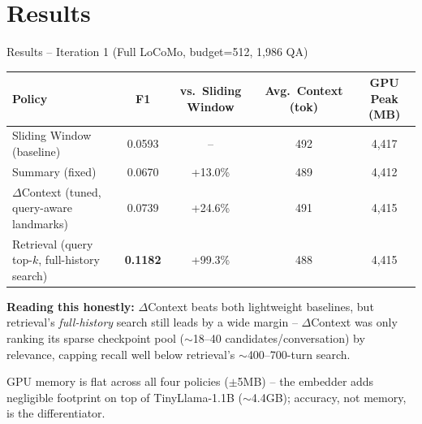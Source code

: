 \documentclass[aspectratio=169]{beamer}
\begin{document}
\section{Results}

\begin{frame}{Results -- Iteration 1 (Full LoCoMo, budget=512, 1{,}986 QA)}
    \begin{table}
    \centering
    \small
    \begin{tabular}{lcccc}
    \toprule
    Policy & F1 & vs.\ Sliding Window & Avg.\ Context (tok) & GPU Peak (MB) \\
    \midrule
    Sliding Window (baseline) & 0.0593 & -- & 492 & 4{,}417 \\
    Summary (fixed) & 0.0670 & +13.0\% & 489 & 4{,}412 \\
    $\Delta$Context (tuned, query-aware landmarks) & 0.0739 & +24.6\% & 491 & 4{,}415 \\
    Retrieval (query top-$k$, full-history search) & \textbf{0.1182} & +99.3\% & 488 & 4{,}415 \\
    \bottomrule
    \end{tabular}
    \end{table}

    \vspace{0.3cm}
    \textbf{Reading this honestly:} $\Delta$Context beats both lightweight baselines, but retrieval's \emph{full-history} search still leads by a wide margin -- $\Delta$Context was only ranking its sparse checkpoint pool ($\sim$18--40 candidates/conversation) by relevance, capping recall well below retrieval's $\sim$400--700-turn search.

    \vspace{0.15cm}
    \small GPU memory is flat across all four policies ($\pm$5MB) -- the embedder adds negligible footprint on top of TinyLlama-1.1B ($\sim$4.4GB); accuracy, not memory, is the differentiator.
\end{frame}
\end{document}
